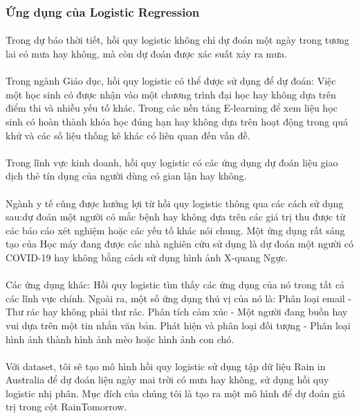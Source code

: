 \documentclass{article}
\begin{document}
\subsubsection{Ứng dụng của Logistic Regression}
\paragraph{}Trong dự báo thời tiết, hồi quy logistic không chỉ dự đoán một ngày trong tương lai có mưa hay không, mà còn dự đoán được xác suất xảy ra mưa.
\paragraph{}Trong ngành Giáo dục, hồi quy logistic có thể được sử dụng để dự đoán: Việc một học sinh có được nhận vào một chương trình đại học hay không dựa trên điểm thi và nhiều yếu tố khác. Trong các nền tảng E-learning để xem liệu học sinh có hoàn thành khóa học đúng hạn hay không dựa trên hoạt động trong quá khứ và các số liệu thống kê khác có liên quan đến vấn đề.
\paragraph{} Trong lĩnh vực kinh doanh, hồi quy logistic có các ứng dụng dự đoán liệu giao dịch thẻ tín dụng của người dùng có gian lận hay không.
\paragraph{}Ngành y tế cũng được hưởng lợi từ hồi quy logistic thông qua các cách sử dụng sau:dự đoán một người có mắc bệnh hay không dựa trên các giá trị thu được từ các báo cáo xét nghiệm hoặc các yếu tố khác nói chung.
Một ứng dụng rất sáng tạo của Học máy đang được các nhà nghiên cứu sử dụng là dự đoán một người có COVID-19 hay không bằng cách sử dụng hình ảnh X-quang Ngực.
\paragraph{}Các ứng dụng khác: Hồi quy logistic tìm thấy các ứng dụng của nó trong tất cả các lĩnh vực chính. Ngoài ra, một số ứng dụng thú vị của nó là: Phân loại email - Thư rác hay không phải thư rác. Phân tích cảm xúc - Một người đang buồn hay vui dựa trên một tin nhắn văn bản. Phát hiện và phân loại đối tượng - Phân loại hình ảnh thành hình ảnh mèo hoặc hình ảnh con chó.
\paragraph{}Với dataset, tôi sẽ tạo mô hình hồi quy logistic sử dụng tập dữ liệu Rain in Australia để dự đoán liệu ngày mai trời có mưa hay không, sử dụng hồi quy logistic nhị phân. Mục đích của chúng tôi là tạo ra một mô hình để dự đoán giá trị trong cột RainTomorrow.
\end{document}
